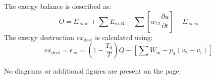 The exergy balance is described as:  
\[
O = \dot{E}_{\text{ex,in}} + \sum \dot{E}_{\text{ex,R}} - \sum \left[ w_{12} \frac{\partial u}{\partial t} \right] - \dot{E}_{\text{ex,ex}}
\]  
The exergy destruction \( ex_{\text{dest}} \) is calculated using:  
\[
ex_{\text{dest}} = \epsilon_{\text{ex}} = \left( 1 - \frac{T_0}{T} \right) Q - \left[ \sum W_{\text{in}} - p_0 (v_2 - v_1) \right]
\]  

No diagrams or additional figures are present on the page.